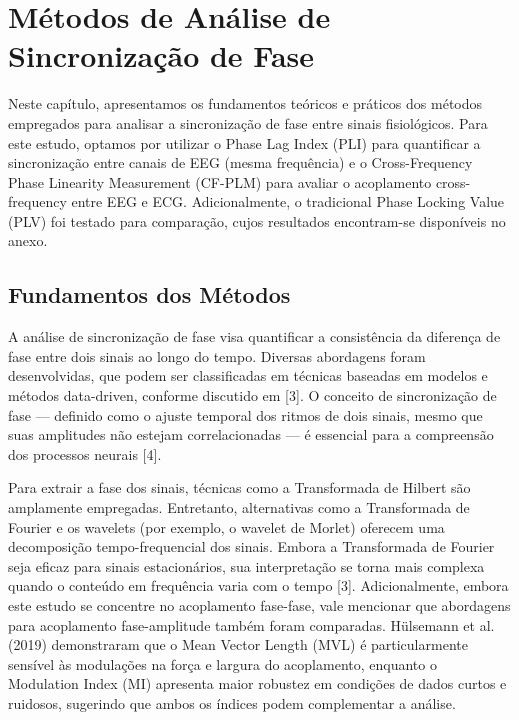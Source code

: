 \chapter{Métodos de Análise de Sincronização de Fase}
\label{chap:6_metodos_de_analise_de_sincronizacao_de_fase}

Neste capítulo, apresentamos os fundamentos teóricos e práticos dos métodos empregados para analisar a sincronização de fase entre sinais fisiológicos. Para este estudo, optamos por utilizar o Phase Lag Index (PLI) para quantificar a sincronização entre canais de EEG (mesma frequência) e o Cross-Frequency Phase Linearity Measurement (CF-PLM) para avaliar o acoplamento cross-frequency entre EEG e ECG. Adicionalmente, o tradicional Phase Locking Value (PLV) foi testado para comparação, cujos resultados encontram-se disponíveis no anexo.

\section{Fundamentos dos Métodos}

A análise de sincronização de fase visa quantificar a consistência da diferença de fase entre dois sinais ao longo do tempo. Diversas abordagens foram desenvolvidas, que podem ser classificadas em técnicas baseadas em modelos e métodos data-driven, conforme discutido em [3]. O conceito de sincronização de fase — definido como o ajuste temporal dos ritmos de dois sinais, mesmo que suas amplitudes não estejam correlacionadas — é essencial para a compreensão dos processos neurais [4].

Para extrair a fase dos sinais, técnicas como a Transformada de Hilbert são amplamente empregadas. Entretanto, alternativas como a Transformada de Fourier e os wavelets (por exemplo, o wavelet de Morlet) oferecem uma decomposição tempo-frequencial dos sinais. Embora a Transformada de Fourier seja eficaz para sinais estacionários, sua interpretação se torna mais complexa quando o conteúdo em frequência varia com o tempo [3]. Adicionalmente, embora este estudo se concentre no acoplamento fase-fase, vale mencionar que abordagens para acoplamento fase-amplitude também foram comparadas. Hülsemann et al. (2019) \cite{hulsemann2019quantification} demonstraram que o Mean Vector Length (MVL) é particularmente sensível às modulações na força e largura do acoplamento, enquanto o Modulation Index (MI) apresenta maior robustez em condições de dados curtos e ruidosos, sugerindo que ambos os índices podem complementar a análise.


